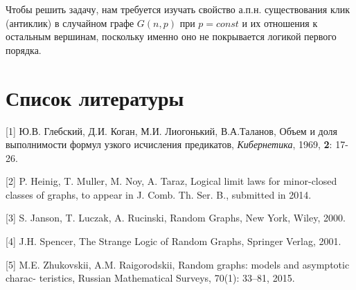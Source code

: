 \documentclass{article}
\begin{document}
	Чтобы решить задачу, нам требуется изучать свойство а.п.н. существования клик (антиклик) в случайном графе $G(n, p)$ при $p = const$ и их отношения к остальным вершинам, поскольку именно оно не покрывается логикой первого порядка.
	
	\section{Список литературы}
	
	[1] Ю.В. Глебский, Д.И. Коган, М.И. Лиогонький, В.А.Таланов, Объем и доля выполнимости формул узкого исчисления предикатов, \textit{Кибернетика}, 1969, \textbf{2}: 17-26.
	
	[2] P. Heinig, T. Muller, M. Noy, A. Taraz, Logical limit laws for minor-closed classes of
	graphs, to appear in J. Comb. Th. Ser. B., submitted in 2014.
	
	[3] S. Janson, T. Luczak, A. Rucinski, Random Graphs, New York, Wiley, 2000.
	
	[4] J.H. Spencer, The Strange Logic of Random Graphs, Springer Verlag, 2001.
	
	[5] M.E. Zhukovskii, A.M. Raigorodskii, Random graphs: models and asymptotic charac-
	teristics, Russian Mathematical Surveys, 70(1): 33–81, 2015.
\end{document}
